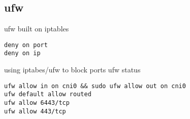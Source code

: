

\subsection{ufw}
ufw built on iptables

\begin{verbatim}
deny on port
deny on ip
\end{verbatim}
using iptabes/ufw to block ports
ufw status
\begin{verbatim}
ufw allow in on cni0 && sudo ufw allow out on cni0
ufw default allow routed
ufw allow 6443/tcp
ufw allow 443/tcp

\end{verbatim}
